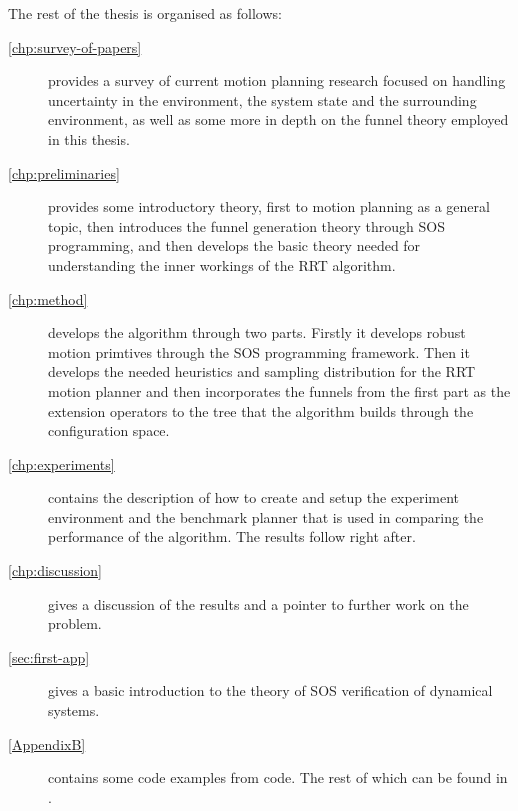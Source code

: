The rest of the thesis is organised as follows:
\begin{description}
    \item[\cref{chp:survey-of-papers}]
      provides a survey of current motion planning research focused on handling
      uncertainty in the environment, the system state and the surrounding
      environment, as well as some more in depth on the funnel theory employed
      in this thesis.
    
    \item[\cref{chp:preliminaries}]
      provides some introductory theory, first to motion planning as a general
      topic, then introduces the funnel generation theory through \ac{SOS}
      programming, and then develops the basic theory needed for understanding
      the inner workings of the \ac{RRT} algorithm.
    
    \item[\cref{chp:method}]
      develops the \rrtfunnel{} algorithm through two parts. Firstly it develops
      robust motion primtives through the \ac{SOS} programming framework. Then
      it develops the needed heuristics and sampling distribution for the
      \ac{RRT} motion planner and then incorporates the funnels from the first
      part as the extension operators to the tree that the algorithm builds
      through the configuration space.
    
    \item[\cref{chp:experiments}]
      contains the description of how to create and setup the experiment
      environment and the benchmark planner that is used in comparing the
      performance of the \rrtfunnel{} algorithm. The results follow right after.
    
    \item[\cref{chp:discussion}]
      gives a discussion of the results and a pointer to further work on the problem.

    \item[\cref{sec:first-app}]
      gives a basic introduction to the theory of \ac{SOS} verification of
      dynamical systems.

    \item[\cref{AppendixB}]
      contains some code examples from code. The rest of which can be found in \cite{my-code}.

   
\end{description}



